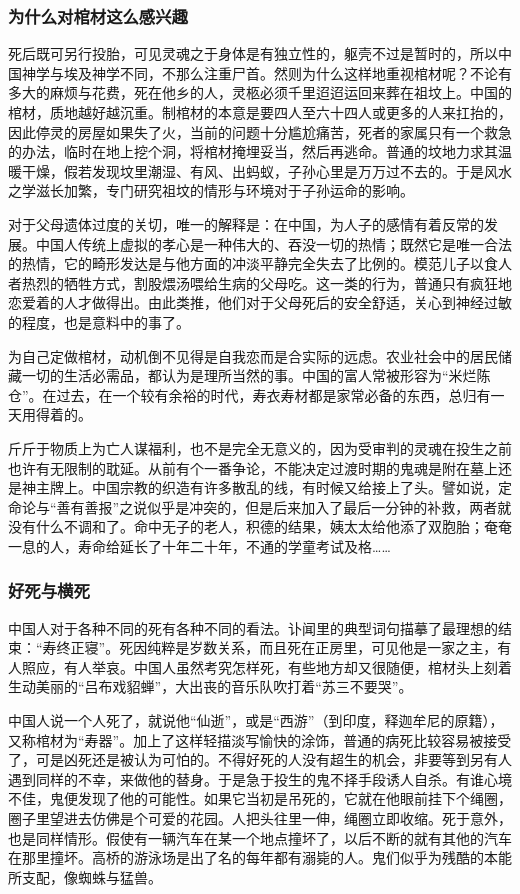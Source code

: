 \subsubsection*{为什么对棺材这么感兴趣}
\par 死后既可另行投胎，可见灵魂之于身体是有独立性的，躯壳不过是暂时的，所以中国神学与埃及神学不同，不那么注重尸首。然则为什么这样地重视棺材呢？不论有多大的麻烦与花费，死在他乡的人，灵柩必须千里迢迢运回来葬在祖坟上。中国的棺材，质地越好越沉重。制棺材的本意是要四人至六十四人或更多的人来扛抬的，因此停灵的房屋如果失了火，当前的问题十分尴尬痛苦，死者的家属只有一个救急的办法，临时在地上挖个洞，将棺材掩埋妥当，然后再逃命。普通的坟地力求其温暖干燥，假若发现坟里潮湿、有风、出蚂蚁，子孙心里是万万过不去的。于是风水之学滋长加繁，专门研究祖坟的情形与环境对于子孙运命的影响。
\par 对于父母遗体过度的关切，唯一的解释是：在中国，为人子的感情有着反常的发展。中国人传统上虚拟的孝心是一种伟大的、吞没一切的热情；既然它是唯一合法的热情，它的畸形发达是与他方面的冲淡平静完全失去了比例的。模范儿子以食人者热烈的牺牲方式，割股煨汤喂给生病的父母吃。这一类的行为，普通只有疯狂地恋爱着的人才做得出。由此类推，他们对于父母死后的安全舒适，关心到神经过敏的程度，也是意料中的事了。
\par 为自己定做棺材，动机倒不见得是自我恋而是合实际的远虑。农业社会中的居民储藏一切的生活必需品，都认为是理所当然的事。中国的富人常被形容为“米烂陈仓”。在过去，在一个较有余裕的时代，寿衣寿材都是家常必备的东西，总归有一天用得着的。
\par 斤斤于物质上为亡人谋福利，也不是完全无意义的，因为受审判的灵魂在投生之前也许有无限制的耽延。从前有个一番争论，不能决定过渡时期的鬼魂是附在墓上还是神主牌上。中国宗教的织造有许多散乱的线，有时候又给接上了头。譬如说，定命论与“善有善报”之说似乎是冲突的，但是后来加入了最后一分钟的补救，两者就没有什么不调和了。命中无子的老人，积德的结果，姨太太给他添了双胞胎；奄奄一息的人，寿命给延长了十年二十年，不通的学童考试及格……
\subsubsection*{好死与横死}
\par 中国人对于各种不同的死有各种不同的看法。讣闻里的典型词句描摹了最理想的结束：“寿终正寝”。死因纯粹是岁数关系，而且死在正房里，可见他是一家之主，有人照应，有人举哀。中国人虽然考究怎样死，有些地方却又很随便，棺材头上刻着生动美丽的“吕布戏貂蝉”，大出丧的音乐队吹打着“苏三不要哭”。
\par 中国人说一个人死了，就说他“仙逝”，或是“西游”（到印度，释迦牟尼的原籍），又称棺材为“寿器”。加上了这样轻描淡写愉快的涂饰，普通的病死比较容易被接受了，可是凶死还是被认为可怕的。不得好死的人没有超生的机会，非要等到另有人遇到同样的不幸，来做他的替身。于是急于投生的鬼不择手段诱人自杀。有谁心境不佳，鬼便发现了他的可能性。如果它当初是吊死的，它就在他眼前挂下个绳圈，圈子里望进去仿佛是个可爱的花园。人把头往里一伸，绳圈立即收缩。死于意外，也是同样情形。假使有一辆汽车在某一个地点撞坏了，以后不断的就有其他的汽车在那里撞坏。高桥的游泳场是出了名的每年都有溺毙的人。鬼们似乎为残酷的本能所支配，像蜘蛛与猛兽。
